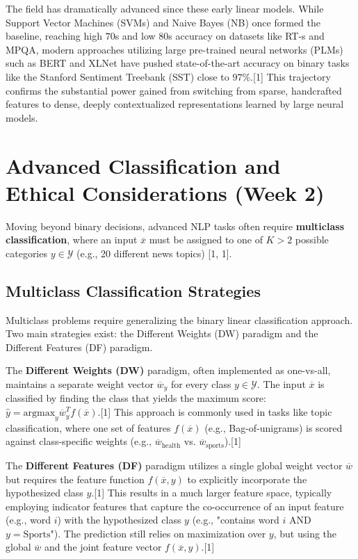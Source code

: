 \documentclass{article}
\begin{document}
The field has dramatically advanced since these early linear models. While Support Vector Machines (SVMs) and Naive Bayes (NB) once formed the baseline, reaching high $70$s and low $80$s accuracy on datasets like RT-s and MPQA, modern approaches utilizing large pre-trained neural networks (PLMs) such as BERT and XLNet have pushed state-of-the-art accuracy on binary tasks like the Stanford Sentiment Treebank (SST) close to $97\%$.[1] This trajectory confirms the substantial power gained from switching from sparse, handcrafted features to dense, deeply contextualized representations learned by large neural models.

\section{Advanced Classification and Ethical Considerations (Week 2)}

Moving beyond binary decisions, advanced NLP tasks often require \textbf{multiclass classification}, where an input $\overline{x}$ must be assigned to one of $K > 2$ possible categories $y \in \mathcal{Y}$ (e.g., 20 different news topics) [1, 1].

\subsection{Multiclass Classification Strategies}

Multiclass problems require generalizing the binary linear classification approach. Two main strategies exist: the Different Weights (DW) paradigm and the Different Features (DF) paradigm.

The \textbf{Different Weights (DW)} paradigm, often implemented as one-vs-all, maintains a separate weight vector $\overline{w}_y$ for every class $y \in \mathcal{Y}$. The input $\overline{x}$ is classified by finding the class that yields the maximum score: $\hat{y} = \text{argmax}_{y} \overline{w}_{y}^{T}f(\overline{x})$.[1] This approach is commonly used in tasks like topic classification, where one set of features $f(\overline{x})$ (e.g., Bag-of-unigrams) is scored against class-specific weights (e.g., $\overline{w}_{\text{health}}$ vs. $\overline{w}_{\text{sports}}$).[1]

The \textbf{Different Features (DF)} paradigm utilizes a single global weight vector $\overline{w}$ but requires the feature function $f(\overline{x}, y)$ to explicitly incorporate the hypothesized class $y$.[1] This results in a much larger feature space, typically employing indicator features that capture the co-occurrence of an input feature (e.g., word $i$) with the hypothesized class $y$ (e.g., "contains word $i$ AND $y=\text{Sports}$"). The prediction still relies on maximization over $y$, but using the global $\overline{w}$ and the joint feature vector $f(\overline{x}, y)$.[1]
\end{document}
